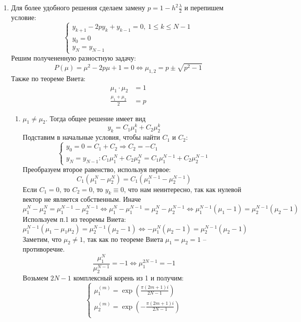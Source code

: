 \documentclass[12pt]{article}
\begin{document}
\begin{enumerate}
	\item Для более удобного решения сделаем замену $p=1-h^2\frac{\lambda}{2}$ и перепишем условие:
	      \[\begin{cases}
			      y_{k+1}-2py_k+y_{k-1} = 0,\ 1 \leq k \leq N-1 \\
			      y_0 = 0                                       \\
			      y_N = y_{N-1}
		      \end{cases}\]
	      Решим получененную разностную задачу:
	      \[P(\mu) = \mu^2-2p\mu+1 = 0 \Leftrightarrow \mu_{1,2}=p \pm \sqrt{p^2-1}\]
	      Также по теореме Виета:
	      \begin{align}
		      \mu_1\cdot \mu_2      & =1  \\
		      \frac{\mu_1+\mu_2}{2} & = p
	      \end{align}
	      \begin{enumerate}
		      \item $\mu_1\neq\mu_2$. Тогда общее решение имеет вид
		            \[y_k=C_1\mu_1^k+C_2\mu_2^k\]
		            Подставим в начальные условия, чтобы найти $C_1$ и $C_2$:
		            \[\begin{cases}
				            y_0 = 0 = C_1+C_2\Rightarrow C_2=-C_1 \\
				            y_N=y_{N-1}: C_1\mu_1^N+C_2\mu_2^N = C_1\mu_1^{N-1}+C_2\mu_2^{N-1}
			            \end{cases}\]
		            Преобразуем второе равенство, используя первое:
		            \[C_1(\mu_1^N-\mu_2^N)=C_1(\mu_1^{N-1}-\mu_2^{N-1})\]
		            Если $C_1 = 0$, то $C_2=0$, то $y_k\equiv 0$, что нам неинтересно, так как нулевой вектор не является собственным. Иначе
		            \[\mu_1^N-\mu_2^N=\mu_1^{N-1}-\mu_2^{N-1} \Leftrightarrow
			            \mu_1^N-\mu_1^{N-1}=\mu_2^N-\mu_2^{N-1} \Leftrightarrow
			            \mu_1^{N-1}(\mu_1-1)=\mu_2^{N-1}(\mu_2-1)\]
		            Используем п.1 из теоремы Виета:
		            \[\mu_1^{N-1}(\mu_1-\mu_1\mu_2)=\mu_2^{N-1}(\mu_2-1)\Leftrightarrow-\mu_1^N(\mu_2-1)=\mu_2^{N-1}(\mu_2-1)\]
		            Заметим, что $\mu_2\neq 1$, так как по теореме Виета $\mu_1=\mu_2=1$ -- противоречие.
		            \[\frac{\mu_1^N}{\mu_2^{N-1}}=-1\Leftrightarrow\mu_1^{2N-1}=-1\]
		            Возьмем $2N-1$ комплексный корень из 1 и получим:
		            \[\begin{cases}
				            \mu_1^{(m)} = \exp(\frac{\pi(2m+1)i}{2N-1})  \\
				            \mu_2^{(m)} = \exp(-\frac{\pi(2m+1)i}{2N-1}) \\

\end{cases}\]
\end{enumerate}
\end{enumerate}
\end{document}
